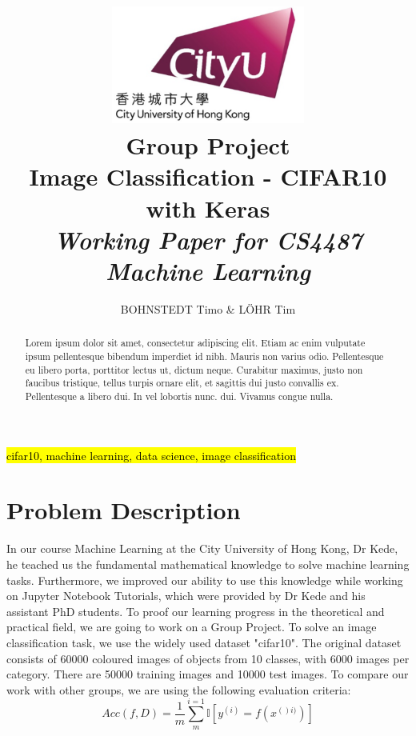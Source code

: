 \documentclass[journal]{IEEEtran}
\begin{document}
    \title{\includegraphics[width=2.5in]{photo/0_cityu} \\
    Group Project \\
    Image  Classification - CIFAR10 with Keras\\
     \textit{Working Paper for CS4487 Machine Learning}
     }
  \author{BOHNSTEDT 	Timo \& L\"OHR Tim \\ 
}

\maketitle
\begin{abstract}
Lorem ipsum dolor sit amet, consectetur adipiscing elit. Etiam ac enim vulputate ipsum pellentesque bibendum imperdiet id nibh. Mauris non varius odio. Pellentesque eu libero porta, porttitor lectus ut, dictum neque. Curabitur maximus, justo non faucibus tristique, tellus turpis ornare elit, et sagittis dui justo convallis ex. Pellentesque a libero dui. In vel lobortis nunc. dui. Vivamus congue nulla.
\end{abstract}

\begin{IEEEkeywords}
\hl{cifar10, machine learning, data science, image classification}
\end{IEEEkeywords}

\IEEEpeerreviewmaketitle

\section{Problem Description}
In our course Machine Learning at the City University of Hong Kong, Dr Kede, he teached us the fundamental mathematical knowledge to solve machine learning tasks. Furthermore, we improved our ability to use this knowledge while working on Jupyter Notebook Tutorials, which were provided by Dr Kede and his assistant PhD students. To proof our learning progress in the theoretical and practical field, we are going to work on a Group Project. To solve an image classification task, we use the widely used dataset "cifar10". The original dataset consists of 60000 coloured images of objects from 10 classes, with 6000 images per category. There are 50000 training images and 10000 test images. To compare our work with other groups, we are using the following evaluation criteria:
\begin{equation}
Acc(f,D) = \frac{1}{m}\sum_{m}^{i=1} \mathbb{I} \left [ y^{(i)} =f(x^{()i)})\right ]
\end{equation}
\end{document}
